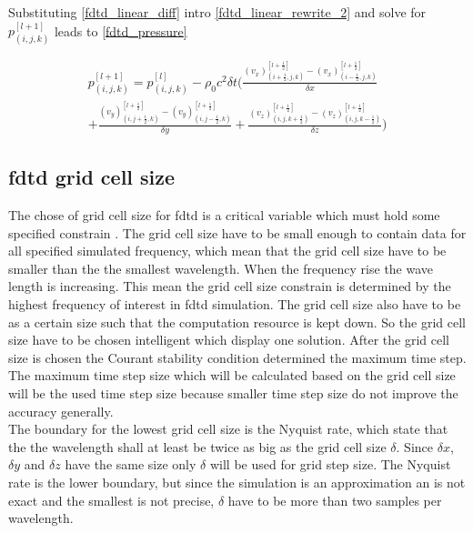 Substituting \autoref{fdtd_linear_diff} intro \autoref{fdtd_linear_rewrite_2} and solve for $p_{(i,j,k)}^{[l+1]}$ leads to  \autoref{fdtd_pressure}




\begin{multline}\label{fdtd_pressure}
p_{(i,j,k)}^{[l+1]} = p_{(i,j,k)}^{[l]} - \rho_0 c^2 \delta t \Biggl( \frac{(v_x)_{(i+\frac{1}{2},j,k)}^{[l+\frac{1}{2}]} - (v_x)_{(i-\frac{1}{2},j,k)}^{[l+\frac{1}{2}]}}{\delta x} \\ 
+ \frac{(v_y)_{(i,j+\frac{1}{2},k)}^{[l+\frac{1}{2}]}-(v_y)_{(i,j-\frac{1}{2},k)}^{[l+\frac{1}{2}]}}{\delta y} +  \frac{(v_z)_{(i,j,k+\frac{1}{2})}^{[l+\frac{1}{2}]}-(v_z)_{(i,j,k-\frac{1}{2})}^{[l+\frac{1}{2}]}}{\delta z} \Biggr)
\end{multline}




\subsection{\gls{fdtd} grid cell size}

The chose of grid cell size for \gls{fdtd} is a critical variable which must hold some specified constrain \citep{Kunz1993}. The grid cell size have to be small enough to contain data for all specified simulated frequency, which mean that the grid cell size have to be smaller than the the smallest wavelength. When the frequency rise the wave length is increasing. This mean the grid cell size constrain is determined by the highest frequency of interest in \gls{fdtd} simulation. The grid cell size also have to be as a certain size such that the computation resource is kept down. So the grid cell size have to be chosen intelligent which \citep{Kunz1993} display one solution. After the grid cell size is chosen the Courant stability condition determined the maximum time step. The maximum time step size which will be calculated based on the grid cell size will be the used time step size because smaller time step size do not improve the accuracy generally. \\


The boundary for the lowest grid cell size is the Nyquist rate, which state that the the wavelength shall at least be twice as big as the grid cell size $\delta$. Since $\delta x$, $\delta y$ and $\delta z$ have the same size only $\delta$ will be used for grid step size. The Nyquist rate is the lower boundary, but since the simulation is an approximation an is not exact and the smallest is not precise, $\delta$ have to be more than two samples per wavelength. 


